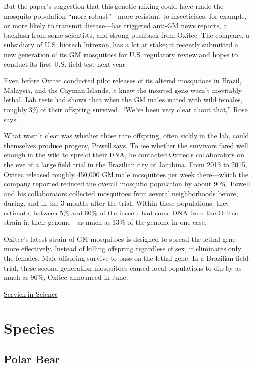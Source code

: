 \documentclass[
]{book}
\begin{document}
But the paper's suggestion that this genetic mixing could have made the mosquito population ``more robust''---more resistant to insecticides, for example, or more likely to transmit disease---has triggered anti-GM news reports, a backlash from some scientists, and strong pushback from Oxitec. The company, a subsidiary of U.S. biotech Intrexon, has a lot at stake; it recently submitted a new generation of its GM mosquitoes for U.S. regulatory review and hopes to conduct its first U.S. field test next year.

Even before Oxitec conducted pilot releases of its altered mosquitoes in Brazil, Malaysia, and the Cayman Islands, it knew the inserted gene wasn't inevitably lethal. Lab tests had shown that when the GM males mated with wild females, roughly 3\% of their offspring survived. ``We've been very clear about that,'' Rose says.

What wasn't clear was whether those rare offspring, often sickly in the lab, could themselves produce progeny, Powell says. To see whether the survivors fared well enough in the wild to spread their DNA, he contacted Oxitec's collaborators on the eve of a large field trial in the Brazilian city of Jacobina. From 2013 to 2015, Oxitec released roughly 450,000 GM male mosquitoes per week there---which the company reported reduced the overall mosquito population by about 90\%. Powell and his collaborators collected mosquitoes from several neighborhoods before, during, and in the 3 months after the trial. Within these populations, they estimate, between 5\% and 60\% of the insects had some DNA from the Oxitec strain in their genome---as much as 13\% of the genome in one case.

Oxitec's latest strain of GM mosquitoes is designed to spread the lethal gene more effectively. Instead of killing offspring regardless of sex, it eliminates only the females. Male offspring survive to pass on the lethal gene. In a Brazilian field trial, these second-generation mosquitoes caused local populations to dip by as much as 96\%, Oxitec announced in June.

\href{https://www.sciencemag.org/news/2019/09/study-dna-spread-genetically-modified-mosquitoes-prompts-backlash}{Servick in Science}

\hypertarget{species}{%
\chapter{Species}\label{species}}

\hypertarget{polar-bear}{%
\section{Polar Bear}\label{polar-bear}}
\end{document}
